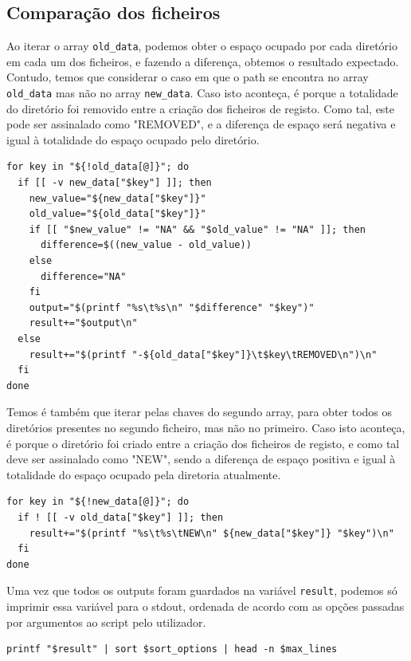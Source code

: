 \subsection{Comparação dos ficheiros}
Ao iterar o array \verb|old_data|, podemos obter o espaço
ocupado por cada diretório em cada um dos ficheiros, e
fazendo a diferença, obtemos o resultado expectado. Contudo,
temos que considerar o caso em que o path se encontra no
array \verb|old_data| mas não no array \verb|new_data|. Caso
isto aconteça, é porque a totalidade do diretório foi
removido entre a criação dos ficheiros de registo. Como tal,
este pode ser assinalado como "REMOVED", e a diferença de
espaço será negativa e igual à totalidade do espaço ocupado pelo diretório.
\begin{verbatim}
for key in "${!old_data[@]}"; do
  if [[ -v new_data["$key"] ]]; then
    new_value="${new_data["$key"]}"
    old_value="${old_data["$key"]}"
    if [[ "$new_value" != "NA" && "$old_value" != "NA" ]]; then
      difference=$((new_value - old_value))
    else
      difference="NA"
    fi
    output="$(printf "%s\t%s\n" "$difference" "$key")"
    result+="$output\n"
  else
    result+="$(printf "-${old_data["$key"]}\t$key\tREMOVED\n")\n"
  fi
done
\end{verbatim}
Temos é também que iterar pelas chaves do segundo array,
para obter todos os diretórios presentes no segundo
ficheiro, mas não no primeiro.
Caso isto aconteça, é porque o diretório foi criado entre a
criação dos ficheiros de registo, e como tal deve ser
assinalado como "NEW", sendo a diferença de espaço positiva
e igual à totalidade do espaço ocupado pela diretoria
atualmente.
\begin{verbatim}
for key in "${!new_data[@]}"; do
  if ! [[ -v old_data["$key"] ]]; then
    result+="$(printf "%s\t%s\tNEW\n" ${new_data["$key"]} "$key")\n"
  fi
done
\end{verbatim}

Uma vez que todos os outputs foram guardados na variável
\verb|result|, podemos só imprimir essa variável para o
stdout, ordenada de acordo com as opções passadas por
argumentos ao script pelo utilizador.
\begin{verbatim}
printf "$result" | sort $sort_options | head -n $max_lines
\end{verbatim}
